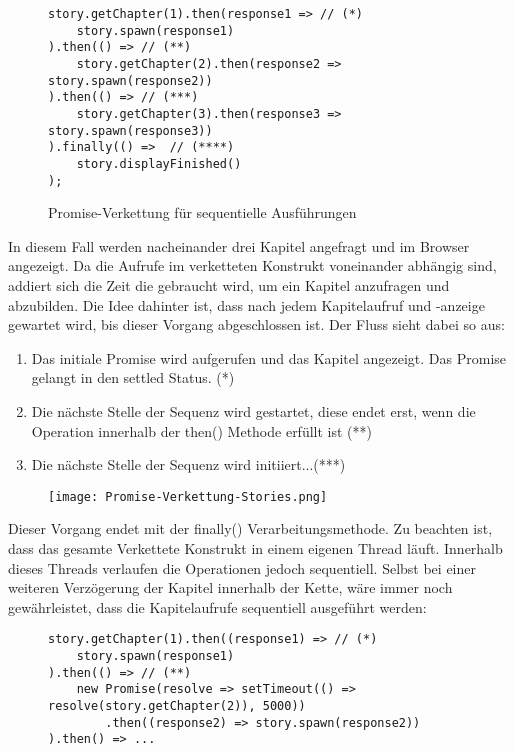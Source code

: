 \begin{figure}[H]
\begin{lstlisting}[basicstyle=\small]
story.getChapter(1).then(response1 => // (*)
    story.spawn(response1)
).then(() => // (**)
    story.getChapter(2).then(response2 => story.spawn(response2))
).then(() => // (***)
    story.getChapter(3).then(response3 => story.spawn(response3))
).finally(() =>  // (****)
    story.displayFinished()
);
\end{lstlisting}
\caption{Promise-Verkettung für sequentielle Ausführungen}
\end{figure}

\noindent
In diesem Fall werden nacheinander drei Kapitel angefragt und im Browser angezeigt. Da die Aufrufe im verketteten Konstrukt voneinander abhängig sind, addiert sich die Zeit die gebraucht wird, um ein Kapitel anzufragen und abzubilden. Die Idee dahinter ist, dass nach jedem Kapitelaufruf und -anzeige gewartet wird, bis dieser Vorgang abgeschlossen ist. Der Fluss sieht dabei so aus:

\begin{enumerate}
    \item Das initiale Promise wird aufgerufen und das Kapitel angezeigt. Das Promise gelangt in den settled Status. (*)
    \item Die nächste Stelle der Sequenz wird gestartet, diese endet erst, wenn die Operation innerhalb der then() Methode erfüllt ist (**)
    \item Die nächste Stelle der Sequenz wird initiiert...(***)
\end{enumerate}

\begin{figure}[H]
\centering
\texttt{[image: Promise-Verkettung-Stories.png]}
\end{figure}

\noindent
Dieser Vorgang endet mit der finally() Verarbeitungsmethode. Zu beachten ist, dass das gesamte Verkettete Konstrukt in einem eigenen Thread läuft. Innerhalb dieses Threads verlaufen die Operationen jedoch sequentiell. Selbst bei einer weiteren Verzögerung der Kapitel innerhalb der Kette, wäre immer noch gewährleistet, dass die Kapitelaufrufe sequentiell ausgeführt werden:

\begin{figure}[H]
\begin{lstlisting}[basicstyle=\small]
story.getChapter(1).then((response1) => // (*)
    story.spawn(response1)
).then(() => // (**)
    new Promise(resolve => setTimeout(() => resolve(story.getChapter(2)), 5000))
        .then((response2) => story.spawn(response2))
).then() => ...
\end{lstlisting}
\end{figure}

